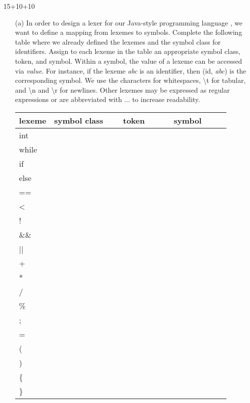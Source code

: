 \begin{exercise}{15+10+10}
\begin{enumerate}
  \item[(a)] In order to design a lexer for our Java-style programming language \while, we want to define a mapping from lexemes to symbols. Complete the following table where we already defined the lexemes and the symbol class for identifiers. Assign to each lexeme in the table an appropriate symbol class, token, and symbol. Within a symbol, the value of a lexeme can be accessed via \emph{value}. For instance, if the lexeme \emph{abc} is an identifier, then (id, \emph{abc}) is the corresponding symbol. We use the characters \textvisiblespace{} for whitespaces, \textbackslash{}t for tabular, and \textbackslash{}n and \textbackslash{}r for newlines. Other lexemes may be expressed as regular expressions or are abbreviated with $\ldots$ to increase readability.
\begin{longtable}{L|l|l|l}
      \hline
      lexeme              & symbol class ~~ & token ~~~~ & symbol ~~~~ \\
      \hline
      int        &   &  &  \\
      while      &   &  &  \\
      if         &   &  &  \\
      else       &   &  &  \\

      ==         &   &  &  \\
      <          &   &  &  \\

      !          &  &  &  \\
      \&\&       &  &  &  \\
      ||         &  &  &  \\

      +          &  &  &  \\
      *          &  &  &  \\
      /          &  &  &  \\
      \%         &  &  &  \\

      ;          &  &  &  \\
      =          &  &  &  \\
      (          &  &  &  \\
      )          &  &  &  \\
      \{         &  &  &  \\
      \}         &  &  &  \\


\end{longtable}
\end{enumerate}
\end{exercise}

